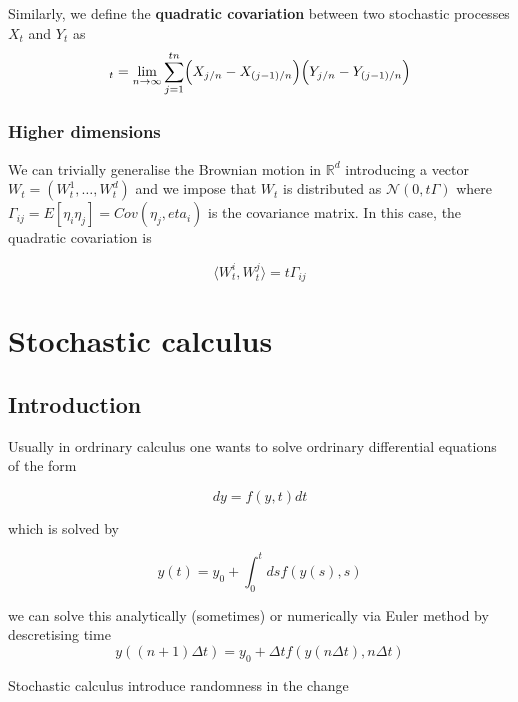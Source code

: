 \documentclass[11pt,a4paper]{article}
\begin{document}
Similarly, we define the \textbf{quadratic covariation} between two stochastic processes $X_t$ and $Y_t$ as
\begin{equation}
    [X,Y]_t = \lim_{n \to \infty} \sum_{j=1}^{tn}\Bigl(X_{j/n}-X_{(j-1)/n} \Bigl)\Bigl(Y_{j/n}-Y_{(j-1)/n} \Bigl) 
\end{equation}

\subsubsection{Higher dimensions}

We can trivially generalise the Brownian motion in $\mathbb{R}^d$ introducing a vector $W_t = (W^{1}_t,\dots, W^{d}_{t})$ and we impose that $W_t$ is distributed as $\mathcal{N}(0,t \Gamma)$ where $\Gamma_{ij} = E[\eta_i\eta_j] = Cov(\eta_j,eta_i)$ is the covariance matrix. In this case, the quadratic covariation is 

\begin{equation}
    \langle W^{i}_t,W^{j}_t\rangle = t\Gamma_{ij}
\end{equation}




\section{Stochastic calculus}

\subsection{Introduction}

Usually in ordrinary calculus one wants to solve ordrinary differential equations of the form 

\begin{equation}
    dy = f(y,t)dt
\end{equation}

which is solved by

\begin{equation}
    y(t) = y_0 + \int_{0}^{t}ds f(y(s),s)
\end{equation}

we can solve this analytically (sometimes) or numerically via Euler method by descretising time
\begin{equation}
    y((n+1)\Delta t) = y_0 + \Delta t f(y(n \Delta t), n\Delta t)
\end{equation}

Stochastic calculus introduce randomness in the change
\end{document}
